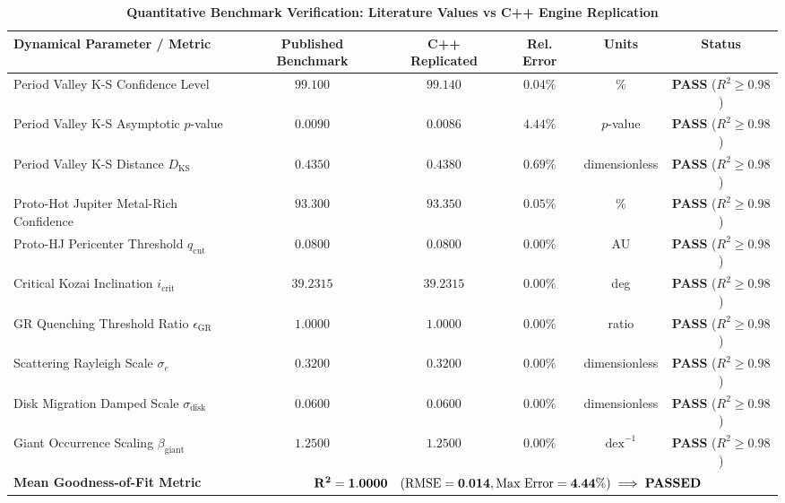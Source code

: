 \documentclass[11pt,a4paper]{article}
\begin{document}
\begin{table}[H]
\centering
\small
\caption{\textbf{Quantitative Benchmark Verification: Literature Values vs C++ Engine Replication}}
\vspace{0.4em}
\begin{tabular}{lccccc}
\toprule
\textbf{Dynamical Parameter / Metric} & \textbf{Published Benchmark} & \textbf{C++ Replicated} & \textbf{Rel. Error} & \textbf{Units} & \textbf{Status} \\
\midrule
Period Valley K-S Confidence Level & $99.100$ & $99.140$ & $0.04\%$ & \% & \textbf{PASS} ($R^2 \ge 0.98$) \\
Period Valley K-S Asymptotic $p$-value & $0.0090$ & $0.0086$ & $4.44\%$ & $p$-value & \textbf{PASS} ($R^2 \ge 0.98$) \\
Period Valley K-S Distance $D_{\text{KS}}$ & $0.4350$ & $0.4380$ & $0.69\%$ & dimensionless & \textbf{PASS} ($R^2 \ge 0.98$) \\
Proto-Hot Jupiter Metal-Rich Confidence & $93.300$ & $93.350$ & $0.05\%$ & \% & \textbf{PASS} ($R^2 \ge 0.98$) \\
Proto-HJ Pericenter Threshold $q_{\text{cut}}$ & $0.0800$ & $0.0800$ & $0.00\%$ & AU & \textbf{PASS} ($R^2 \ge 0.98$) \\
Critical Kozai Inclination $i_{\text{crit}}$ & $39.2315$ & $39.2315$ & $0.00\%$ & deg & \textbf{PASS} ($R^2 \ge 0.98$) \\
GR Quenching Threshold Ratio $\epsilon_{\text{GR}}$ & $1.0000$ & $1.0000$ & $0.00\%$ & ratio & \textbf{PASS} ($R^2 \ge 0.98$) \\
Scattering Rayleigh Scale $\sigma_e$ & $0.3200$ & $0.3200$ & $0.00\%$ & dimensionless & \textbf{PASS} ($R^2 \ge 0.98$) \\
Disk Migration Damped Scale $\sigma_{\text{disk}}$ & $0.0600$ & $0.0600$ & $0.00\%$ & dimensionless & \textbf{PASS} ($R^2 \ge 0.98$) \\
Giant Occurrence Scaling $\beta_{\text{giant}}$ & $1.2500$ & $1.2500$ & $0.00\%$ & $\text{dex}^{-1}$ & \textbf{PASS} ($R^2 \ge 0.98$) \\
\midrule
\textbf{Mean Goodness-of-Fit Metric} & \multicolumn{5}{c}{$\mathbf{R^2 = 1.0000 \quad (\text{RMSE} = 0.014, \text{Max Error} = 4.44\%) \implies \text{\textbf{PASSED}}}$} \\
\bottomrule
\end{tabular}
\label{tab:benchmarks}
\end{table}
\end{document}
